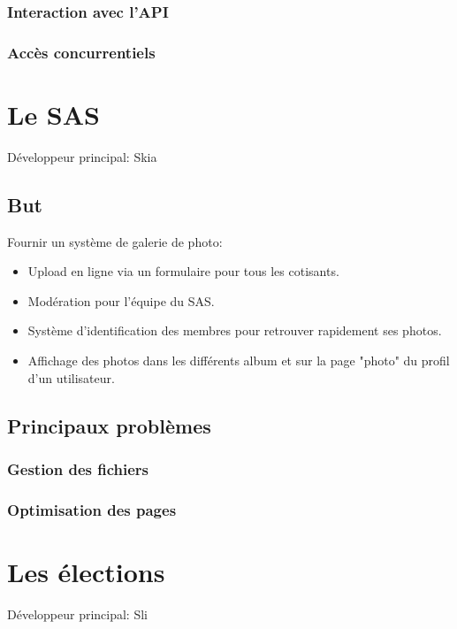 \documentclass[a4paper]{report}
\begin{document}
\subsection{Interaction avec l'API}
\label{sub:interaction_avec_l_api}

\subsection{Accès concurrentiels}
\label{sub:acces_concurrentiels}



\chapter{Le SAS}
\label{sec:le_sas}
\par Développeur principal: Skia

\section{But}
\label{sub:but}
\par Fournir un système de galerie de photo:
\begin{itemize}
    \item Upload en ligne via un formulaire pour tous les cotisants.
    \item Modération pour l'équipe du SAS.
    \item Système d'identification des membres pour retrouver rapidement ses photos.
    \item Affichage des photos dans les différents album et sur la page "photo" du profil d'un utilisateur.
\end{itemize}

\section{Principaux problèmes}
\label{sec:principaux_problemes}

\subsection{Gestion des fichiers}
\label{sub:gestion_des_fichiers}

\subsection{Optimisation des pages}
\label{sub:optimisation_des_pages}


\chapter{Les élections}
\label{sec:les_elections}
\par Développeur principal: Sli
\end{document}

